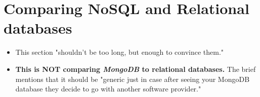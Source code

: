 \chapter{Comparing NoSQL and Relational databases} 
\begin{itemize}
    \item This section "shouldn't be too long, but enough to convince them."
    \item \textbf{This is NOT comparing \textit{MongoDB} to relational databases.} The brief 
    mentions that it should be "generic just in case after seeing your MongoDB database they decide to go with another software provider."
\end{itemize}





